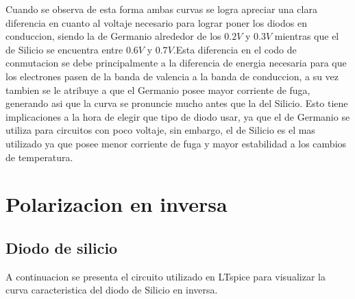 \documentclass[chaptersright]{informeutn}
\begin{document}
                Cuando se observa de esta forma ambas curvas se logra apreciar una clara diferencia en cuanto al voltaje necesario para lograr poner los diodos en conduccion, siendo la de Germanio alrededor de los $0.2V$ y $0.3V$ mientras que el de Silicio se encuentra entre $0.6V$ y $0.7V$.Esta diferencia en el codo de conmutacion se debe principalmente a la diferencia de energia necesaria para que los electrones pasen de la banda de valencia a la banda de conduccion, a su vez tambien se le atribuye a que el Germanio posee mayor corriente de fuga, generando asi que la curva se pronuncie mucho antes que la del Silicio. Esto tiene implicaciones a la hora de elegir que tipo de diodo usar, ya que el de Germanio se utiliza para circuitos con poco voltaje, sin embargo, el de Silicio es el mas utilizado ya que posee menor corriente de fuga y mayor estabilidad a los cambios de temperatura.

                \newpage

                \section{Polarizacion en inversa}
                    \subsection{Diodo de silicio}
                        A continuacion se presenta el circuito utilizado en LTspice para visualizar la curva caracteristica del diodo de Silicio en inversa.
                        
\end{document}
